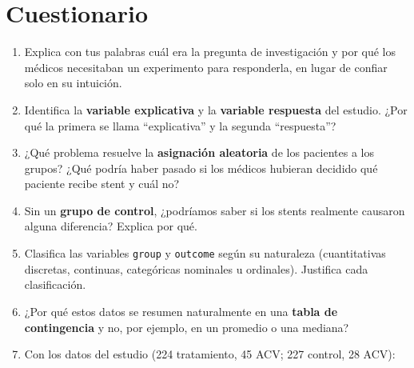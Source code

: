 \documentclass[
  spanish,
  letterpaper,
  DIV=11,
  numbers=noendperiod]{scrartcl}
\begin{document}
\section{Cuestionario}\label{cuestionario}

\begin{enumerate}
\def\labelenumi{\arabic{enumi}.}
\item
  Explica con tus palabras cuál era la pregunta de investigación y por
  qué los médicos necesitaban un experimento para responderla, en lugar
  de confiar solo en su intuición.
\item
  Identifica la \textbf{variable explicativa} y la \textbf{variable
  respuesta} del estudio. ¿Por qué la primera se llama ``explicativa'' y
  la segunda ``respuesta''?
\item
  ¿Qué problema resuelve la \textbf{asignación aleatoria} de los
  pacientes a los grupos? ¿Qué podría haber pasado si los médicos
  hubieran decidido qué paciente recibe stent y cuál no?
\item
  Sin un \textbf{grupo de control}, ¿podríamos saber si los stents
  realmente causaron alguna diferencia? Explica por qué.
\item
  Clasifica las variables \texttt{group} y \texttt{outcome} según su
  naturaleza (cuantitativas discretas, continuas, categóricas nominales
  u ordinales). Justifica cada clasificación.
\item
  ¿Por qué estos datos se resumen naturalmente en una \textbf{tabla de
  contingencia} y no, por ejemplo, en un promedio o una mediana?
\item
  Con los datos del estudio (224 tratamiento, 45 ACV; 227 control, 28
  ACV):


\end{enumerate}
\end{document}
